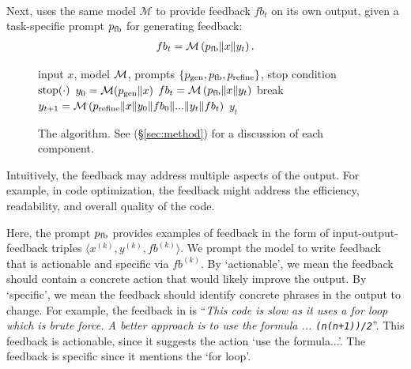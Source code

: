 \paragraph{\fbmod}
Next, 
\ours uses the same model $\mathcal{M}$ to provide feedback $fb_t$ on its own output, given a task-specific prompt $p_{\text{fb}}$ for generating feedback:
\begin{align}
    fb_t = \mathcal{M}\left(p_{\text{fb}} \| x \| y_t\right).
    \label{eq:feedback}
\end{align}
\begin{figure}[!t]
        \centering
        \small
        \begin{algorithm}[H]
            \caption{\ours algorithm}\label{alg:ours}
            \begin{algorithmic}[1]
                \Require input $x$, model $\mathcal{M}$, prompts $\{p_{\text{gen}},p_{\text{fb}},p_{\text{refine}}\}$, stop condition $\mathrm{stop}(\cdot)$
                \State $y_0=\mathcal{M}(p_{\text{gen}}\|x)$ 
                    \State $fb_t = \mathcal{M}\left(p_{\text{fb}} \| x \| y_t\right) $  
                     
                        \State break      
                    \Else
                        \State $y_{t+1} = \mathcal{M}\left(p_{\text{refine}} \| x \| y_0 \| fb_0 \| ... \| y   _t \| fb_t\right)$  
                    \EndIf
                \EndFor
                \State \Return $y_t$   
            \end{algorithmic}
        \end{algorithm}
        \label{fig:ours:abstract}  
    \hfill
    \vspace{-2em}
    \caption{The \ours algorithm. 
    See (\S\ref{sec:method}) for a discussion of each component. 
    }
    \label{fig:method:abstract}    
\end{figure}
Intuitively, the feedback may
address multiple aspects of the output. 
For example, in code optimization, the feedback might address the efficiency, readability, and overall quality of the code. 

Here, the prompt $p_{\text{fb}}$ provides examples of feedback in the form of input-output-feedback triples $\langle x^{(k)}, y^{(k)}, fb^{(k)} \rangle$.
We prompt the model to write feedback that is actionable and specific via $fb^{(k)}$.
By `actionable', we mean the feedback should contain a concrete action that would likely improve the output.
By `specific', we mean the feedback should identify concrete phrases in the output to change.
For example, %
the feedback in  is ``\emph{This code is slow as it uses a for loop which is brute force. A better approach is to use the formula ... \texttt{(n(n+1))/2}}''.
This feedback is actionable, since it suggests the action `use the formula...'.
The feedback is specific since it mentions the `for loop'.

